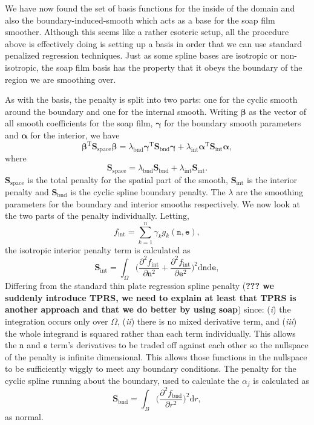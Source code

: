 \documentclass[10pt] {article}
\newcommand{\beq}{\begin{equation}}
\newcommand{\eeq}{\end{equation}}
\theoremstyle{definition}
\theoremstyle{plain}
\begin{document}
We have now found the set of basis functions for the inside of the domain and also the boundary-induced-smooth which acts as a base for the soap film smoother. Although this seems like a rather esoteric setup, all the procedure above is effectively doing is setting up a basis in order that we can use standard penalized regression techniques. Just as some spline bases are isotropic or non-isotropic, the soap film basis has the property that it obeys the boundary of the region we are smoothing over.

As with the basis, the penalty is split into two parts: one for the cyclic smooth around the boundary and one for the internal smooth. Writing $\bm\beta$ as the vector of all smooth coefficients for the soap film, $\bm\gamma$ for the boundary smooth parameters and $\bm\alpha$ for the interior, we have
$$
\bm\beta^\text{T}\textbf{S}_\text{space}\bm{\beta} = \lambda_\text{bnd} \bm\gamma^\text{T}\textbf{S}_\text{bnd}\bm{\gamma} + \lambda_\text{int} \bm{\alpha}^\text{T}\textbf{S}_\text{int}\bm{\alpha},
$$
where 
$$
\textbf{S}_\text{space} = \lambda_\text{bnd} \textbf{S}_\text{bnd} + \lambda_\text{int} \textbf{S}_\text{int}.
$$
$\textbf{S}_\text{space}$ is the total penalty for the spatial part of the smooth, $\textbf{S}_\text{int}$ is the interior penalty and $\textbf{S}_\text{bnd}$ is the cyclic spline boundary penalty. The $\lambda$ are the smoothing parameters for the boundary and interior smooths respectively. We now look at the two parts of the penalty individually. Letting,
$$
f_\text{int}=\sum_{k=1}^n \gamma_k g_k(\texttt{n},\texttt{e}),
$$
the isotropic interior penalty term is calculated as
$$
\textbf{S}_\text{int} = \int_\Omega \Big(\frac{\partial^2 f_\text{int}}{\partial \texttt{n}^2}+\frac{\partial^2 f_\text{int}}{\partial \texttt{e}^2} 
\Big)^2\text{d}\texttt{n}\text{d}\texttt{e},
$$
Differing from the standard thin plate regression spline penalty (\textbf{??? we suddenly introduce TPRS, we need to explain at least that TPRS is another approach and that we do better by using soap}) since: (\emph{i}) the integration occurs only over $\Omega$, (\emph{ii}) there is no mixed derivative term, and (\emph{iii}) the whole integrand is squared rather than each term individually. This allows the $\texttt{n}$ and $\texttt{e}$ term's derivatives to be traded off against each other so the nullspace of the penalty is infinite dimensional. This allows those functions in the nullspace to be sufficiently wiggly to meet any boundary conditions. The penalty for the cyclic spline running about the boundary, used to calculate the $\alpha_j$ is calculated as
\beq
\textbf{S}_\text{bnd} = \int_B \Big(\frac{\partial^2 f_\text{bnd}}{\partial r^2}\Big)^2 \text{d}r, 
\eeq
as normal.
\end{document}
